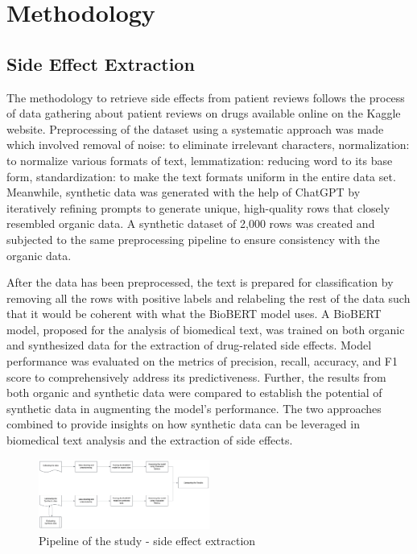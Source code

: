 \documentclass[sigplan,screen]{acmart}
\begin{document}
\section{Methodology}
\subsection{Side Effect Extraction}
The methodology to retrieve side effects from patient reviews follows the process of data gathering about patient reviews on drugs available online on the Kaggle website. Preprocessing of the dataset using a systematic approach was made which involved removal of noise: to eliminate irrelevant characters, normalization: to normalize various formats of text, lemmatization: reducing word to its base form, standardization: to make the text formats uniform in the entire data set. Meanwhile, synthetic data was generated with the help of ChatGPT by iteratively refining prompts to generate unique, high-quality rows that closely resembled organic data. A synthetic dataset of 2,000 rows was created and subjected to the same preprocessing pipeline to ensure consistency with the organic data.

After the data has been preprocessed, the text is prepared for classification by removing all the rows with positive labels and relabeling the rest of the data such that it would be coherent with what the BioBERT model uses. A BioBERT model, proposed for the analysis of biomedical text, was trained on both organic and synthesized data for the extraction of drug-related side effects. Model performance was evaluated on the metrics of precision, recall, accuracy, and F1 score to comprehensively address its predictiveness. Further, the results from both organic and synthetic data were compared to establish the potential of synthetic data in augmenting the model's performance. The two approaches combined to provide insights on how synthetic data can be leveraged in biomedical text analysis and the extraction of side effects.

\begin{figure}[htbp]
    \centering
    \includegraphics[width=0.5\textwidth]{Side_Effects_Extrcation.png}  %
    \caption{Pipeline of the study - side effect extraction}
    \label{fig:your_label}
\end{figure}
\end{document}
